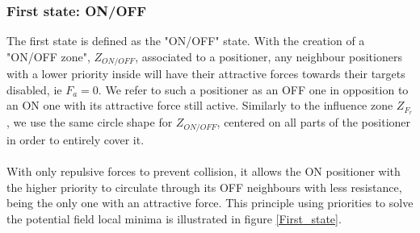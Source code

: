\documentclass[]{spie}  %
\begin{document}
	\subsubsection{First state: ON/OFF}
	\label{first_state_chap}
	The first state  is defined as the "ON/OFF" state. With the creation of a "ON/OFF zone", $Z_{ON/OFF}$, associated to a positioner, any neighbour positioners with a lower priority inside will have their attractive forces towards their targets disabled, ie $F_a = 0$. We refer to such a positioner as an OFF one in opposition to an ON one with its attractive force still active.
	Similarly to the influence zone $Z_{F_{r}}$, we use the same circle shape for $Z_{ON/OFF}$, centered on all parts of the positioner in order to entirely cover it.\\\\
	 With only repulsive forces to prevent collision, it allows the ON positioner with the higher priority to circulate through its OFF neighbours with less resistance, being the only one with an attractive force. This principle using priorities to solve the potential field local minima is illustrated in figure \ref{First_state}. 	
\end{document}
